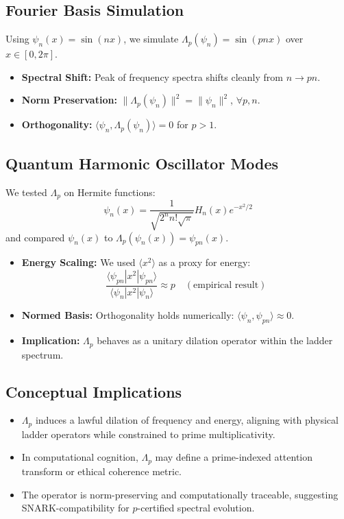 \documentclass[12]{amsart}
\theoremstyle{plain}
\begin{document}
\subsection{Fourier Basis Simulation}

Using $\psi_n(x) = \sin(n x)$, we simulate $\Lambda_p(\psi_n) = \sin(pn x)$ over $x \in [0, 2\pi]$.

\begin{itemize}
    \item \textbf{Spectral Shift:} Peak of frequency spectra shifts cleanly from $n \rightarrow pn$.
    \item \textbf{Norm Preservation:} $\|\Lambda_p(\psi_n)\|^2 = \|\psi_n\|^2$, $\forall p, n$.
    \item \textbf{Orthogonality:} $\langle \psi_n, \Lambda_p(\psi_n) \rangle = 0$ for $p > 1$.
\end{itemize}

\subsection{Quantum Harmonic Oscillator Modes}

We tested $\Lambda_p$ on Hermite functions:
\[
\psi_n(x) = \frac{1}{\sqrt{2^n n! \sqrt{\pi}}} H_n(x) e^{-x^2/2}
\]
and compared $\psi_n(x)$ to $\Lambda_p(\psi_n(x)) = \psi_{pn}(x)$.

\begin{itemize}
    \item \textbf{Energy Scaling:} We used $\langle x^2 \rangle$ as a proxy for energy:
    \[
    \frac{\langle \psi_{pn} | x^2 | \psi_{pn} \rangle}{\langle \psi_n | x^2 | \psi_n \rangle} \approx p \quad (\text{empirical result})
    \]
    \item \textbf{Normed Basis:} Orthogonality holds numerically: $\langle \psi_n, \psi_{pn} \rangle \approx 0$.
    \item \textbf{Implication:} $\Lambda_p$ behaves as a unitary dilation operator within the ladder spectrum.
\end{itemize}

\subsection{Conceptual Implications}

\begin{itemize}
    \item $\Lambda_p$ induces a lawful dilation of frequency and energy, aligning with physical ladder operators while constrained to prime multiplicativity.
    \item In computational cognition, $\Lambda_p$ may define a prime-indexed attention transform or ethical coherence metric.
    \item The operator is norm-preserving and computationally traceable, suggesting SNARK-compatibility for $p$-certified spectral evolution.
\end{itemize}
\end{document}
